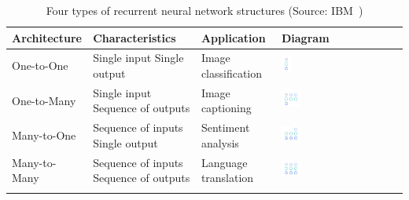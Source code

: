 \begin{table}
    \centering
    \begin{tabular}{p{}p{}p{}p{}}
        \toprule
        \textbf{Architecture} & \textbf{Characteristics} & \textbf{Application} & \textbf{Diagram} \\
        \midrule

        One-to-One & Single input \newline Single output & Image classification & 
        \includegraphics[width=0.08\textwidth]{Figures/onetoone.png} \\

        One-to-Many & Single input \newline Sequence of outputs & Image captioning & 
        \includegraphics[width=0.16\textwidth]{Figures/onetomany.png} \\

        Many-to-One & Sequence of inputs \newline Single output & Sentiment analysis & 
        \includegraphics[width=0.16\textwidth]{Figures/manytoone.png} \\

        Many-to-Many & Sequence of inputs \newline Sequence of outputs & Language translation & 
        \includegraphics[width=0.16\textwidth]{Figures/manytomany.png} \\

        \bottomrule\\
    \end{tabular}
    \caption{Four types of recurrent neural network structures (Source: IBM~\cite{ibm_cloud_education_2020})}
    \label{tab:RNNStructures}
\end{table}

